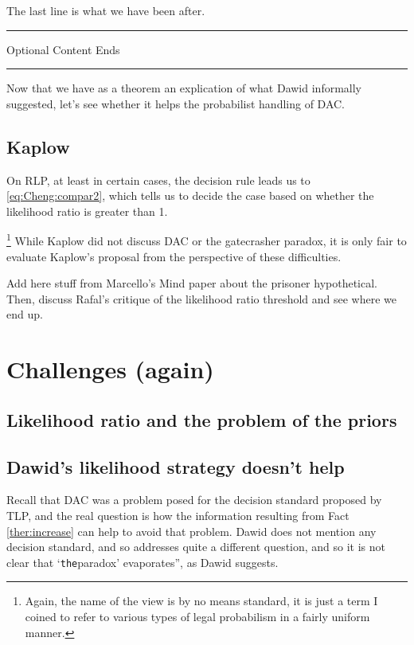 \documentclass[10pt,dvipsnames,enabledeprecatedfontcommands]{scrartcl}
\newcommand{\intermezzob}{\nopagebreak 
	\begin{minipage}[c]{13cm}
	\begin{center}\rule{10cm}{0.4pt}

	\tiny{\sc Optional Content Ends}
	
	\vspace{-1mm}
	
	\rule{10cm}{0.4pt}\end{center}
	\end{minipage}
	}
\begin{document}
\vspace{1mm}

The last line is what we have been after.

\intermezzob

Now that we have as a theorem an explication of what Dawid informally
suggested, let's see whether it helps the probabilist handling of DAC.

\subsection{Kaplow}\label{kaplow-1}

On RLP, at least in certain cases, the decision rule leads us to
\eqref{eq:Cheng:compar2}, which tells us to decide the case based on
whether the likelihood ratio is greater than 1.

\footnote{Again, the name of the view is by no means standard, it is  just a term I coined to refer to various types of legal probabilism in a fairly uniform manner.}
While Kaplow did not discuss DAC or the gatecrasher paradox, it is only
fair to evaluate Kaplow's proposal from the perspective of these
difficulties.

Add here stuff from Marcello's Mind paper about the prisoner
hypothetical. Then, discuss Rafal's critique of the likelihood ratio
threshold and see where we end up.

\section{Challenges (again)}\label{challenges-again}

\subsection{Likelihood ratio and the problem of the
priors}\label{likelihood-ratio-and-the-problem-of-the-priors}

\subsection{Dawid's likelihood strategy doesn't
help}\label{dawids-likelihood-strategy-doesnt-help}

Recall that DAC was a problem posed for the decision standard proposed
by TLP, and the real question is how the information resulting from Fact
\ref{ther:increase} can help to avoid that problem. Dawid does not
mention any decision standard, and so addresses quite a different
question, and so it is not clear that `\texttt{the}paradox'
evaporates'', as Dawid suggests.
\end{document}
